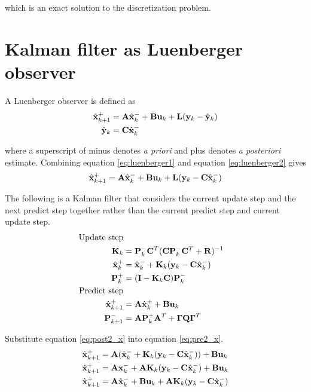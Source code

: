 which is an exact solution to the \gls{discretization} problem.

\section{Kalman filter as Luenberger observer}
\label{sec:deriv_kalman_luenberger}

A Luenberger \gls{observer} is defined as
\begin{align}
  \hat{\mathbf{x}}_{k+1}^+ &= \mathbf{A}\hat{\mathbf{x}}_k^- + \mathbf{B}\mathbf{u}_k + \mathbf{L}
    (\mathbf{y}_k - \hat{\mathbf{y}}_k) \label{eq:luenberger1} \\
  \hat{\mathbf{y}}_k &= \mathbf{C} \hat{\mathbf{x}}_k^- \label{eq:luenberger2}
\end{align}

where a superscript of minus denotes \textit{a priori} and plus denotes
\textit{a posteriori} estimate. Combining equation \eqref{eq:luenberger1} and
equation \eqref{eq:luenberger2} gives
\begin{equation} \label{eq:luenberger}
  \hat{\mathbf{x}}_{k+1}^+ = \mathbf{A}\hat{\mathbf{x}}_k^- + \mathbf{B}\mathbf{u}_k + \mathbf{L}
    (\mathbf{y}_k - \mathbf{C}\hat{\mathbf{x}}_k^-)
\end{equation}

The following is a Kalman filter that considers the current update step and the
next predict step together rather than the current predict step and current
update step.
\begin{align}
  \text{Update step} \nonumber \\
  \mathbf{K}_k &= \mathbf{P}_k^- \mathbf{C}^T (\mathbf{C}\mathbf{P}_k^- \mathbf{C}^T +
    \mathbf{R})^{-1} \\
  \hat{\mathbf{x}}_k^+ &= \hat{\mathbf{x}}_k^- + \mathbf{K}_k(\mathbf{y}_k -
    \mathbf{C}\hat{\mathbf{x}}_k^-) \label{eq:post2_x} \\
  \mathbf{P}_k^+ &= (\mathbf{I} - \mathbf{K}_k\mathbf{C})\mathbf{P}_k^- \\
  \text{Predict step} \nonumber \\
  \hat{\mathbf{x}}_{k+1}^+ &= \mathbf{A}\hat{\mathbf{x}}_k^+ + \mathbf{B}\mathbf{u}_k
    \label{eq:pre2_x} \\
  \mathbf{P}_{k+1}^- &= \mathbf{A} \mathbf{P}_k^+ \mathbf{A}^T +
    \mathbf{\Gamma}\mathbf{Q}\mathbf{\Gamma}^T
\end{align}

Substitute equation \eqref{eq:post2_x} into equation \eqref{eq:pre2_x}.
\begin{align*}
  \hat{\mathbf{x}}_{k+1}^+ &= \mathbf{A}(\hat{\mathbf{x}}_k^- + \mathbf{K}_k(\mathbf{y}_k -
    \mathbf{C}\hat{\mathbf{x}}_k^-)) + \mathbf{B}\mathbf{u}_k \\
  \hat{\mathbf{x}}_{k+1}^+ &= \mathbf{A}\mathbf{x}_k^- + \mathbf{A}\mathbf{K}_k(\mathbf{y}_k -
    \mathbf{C}\hat{\mathbf{x}}_k^-) + \mathbf{B}\mathbf{u}_k \\
  \hat{\mathbf{x}}_{k+1}^+ &= \mathbf{A}\hat{\mathbf{x}}_k^- + \mathbf{B}\mathbf{u}_k +
    \mathbf{A}\mathbf{K}_k(\mathbf{y}_k - \mathbf{C}\hat{\mathbf{x}}_k^-)
\end{align*}

